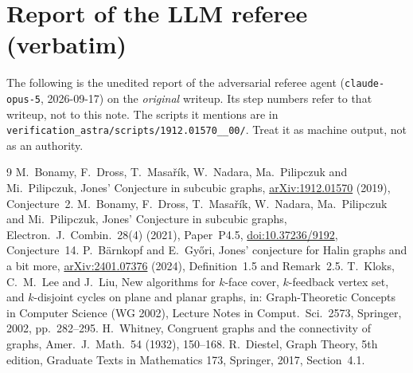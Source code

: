 \documentclass[11pt,a4paper]{article}
\theoremstyle{plain}
\theoremstyle{definition}
\theoremstyle{remark}
\begin{document}
\section{Report of the LLM referee (verbatim)}\label{app:referee}

\begin{tcolorbox}[colback=gray!8,colframe=gray!50,boxrule=0.4pt,arc=2pt]
\small The following is the unedited report of the adversarial referee agent (\texttt{claude-opus-5}, 2026-09-17) on the \emph{original} writeup. Its step numbers refer to that writeup, not to this note. The scripts it mentions are in \texttt{verification\_astra/scripts/1912.01570\_\_00/}. Treat it as machine output, not as an authority.
\end{tcolorbox}



\begin{thebibliography}{9}
\small
\setlength{\itemsep}{2pt}
 M.~Bonamy, F.~Dross, T.~Masařík, W.~Nadara, Ma.~Pilipczuk and Mi.~Pilipczuk, Jones' Conjecture in subcubic graphs, \href{https://arxiv.org/abs/1912.01570}{arXiv:1912.01570} (2019), Conjecture~2.
 M.~Bonamy, F.~Dross, T.~Masařík, W.~Nadara, Ma.~Pilipczuk and Mi.~Pilipczuk, Jones' Conjecture in subcubic graphs, Electron.\ J.\ Combin.\ 28(4) (2021), Paper~P4.5, \href{https://doi.org/10.37236/9192}{doi:10.37236/9192}, Conjecture~14.
 P.~Bärnkopf and E.~Győri, Jones' conjecture for Halin graphs and a bit more, \href{https://arxiv.org/abs/2401.07376}{arXiv:2401.07376} (2024), Definition~1.5 and Remark~2.5.
 T.~Kloks, C.~M.~Lee and J.~Liu, New algorithms for $k$-face cover, $k$-feedback vertex set, and $k$-disjoint cycles on plane and planar graphs, in: Graph-Theoretic Concepts in Computer Science (WG 2002), Lecture Notes in Comput.\ Sci.\ 2573, Springer, 2002, pp.~282--295.
 H.~Whitney, Congruent graphs and the connectivity of graphs, Amer.\ J.\ Math.\ 54 (1932), 150--168.
 R.~Diestel, Graph Theory, 5th edition, Graduate Texts in Mathematics 173, Springer, 2017, Section~4.1.
\end{thebibliography}
\end{document}
